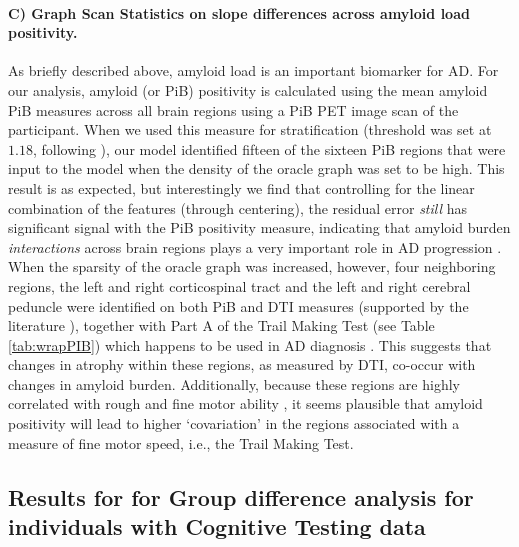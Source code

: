 \paragraph{C) Graph Scan Statistics on slope differences across amyloid load positivity.} 
As briefly described above, amyloid load is an important biomarker for AD. For our analysis, amyloid (or PiB) positivity 
is calculated using the mean amyloid PiB measures across all brain regions using a PiB PET image scan of the participant. 
When we used this measure for stratification (threshold was set at $1.18$, following \cite{darst2017pathway}), 
our model identified fifteen of the sixteen PiB regions that were input to the model when the density of the oracle graph was set to be high. 
This result is as expected, but interestingly we find that controlling for the linear combination of the features (through centering), 
the residual error \textit{still} has significant signal with the PiB positivity measure, indicating that amyloid burden \textit{interactions} 
across brain regions plays a very important role in AD progression \citep{hardy2002amyloid,hardy1992alzheimer,tanzi2005twenty,jack2010brain}. When the sparsity of the oracle graph was increased, however, four neighboring regions, the left and right corticospinal tract and the left and right cerebral peduncle were identified on both PiB and DTI measures (supported by the literature \citep{douaud2011dti}), together with Part A of the Trail Making Test (see Table \ref{tab:wrapPIB}) which 
happens to be used in AD diagnosis \citep{albert2011diagnosis}. 
This suggests that changes in atrophy within these regions, as measured by DTI, co-occur with changes in amyloid burden. Additionally, because these regions are highly correlated with rough and fine motor ability \citep{naidich2009duvernoy}, it seems plausible that amyloid positivity will lead to higher `covariation' in the regions associated with 
a measure of fine motor speed, i.e., the Trail Making Test.

\subsection{Results for for Group difference analysis for individuals with Cognitive Testing data}

